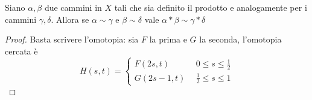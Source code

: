 \begin{theorem}
	Siano $\alpha, \beta$ due cammini in $X$ tali che sia definito il prodotto e analogamente per i cammini $\gamma, \delta$. Allora se $\alpha \sim \gamma$ e $\beta \sim \delta$ vale $\alpha * \beta \sim \gamma * \delta$
\end{theorem}
\begin{proof} Basta scrivere l'omotopia: sia $F$ la prima e $G$ la seconda, l'omotopia cercata è
	\begin{equation*}
	H(s,t)=\begin{cases}
	F(2s,t) \ \ & 0 \leq s \leq \frac{1}{2}\\
	G(2s-1,t) \ \ & \frac{1}{2} \leq s \leq 1
	\end{cases}
	\end{equation*}
\end{proof}

